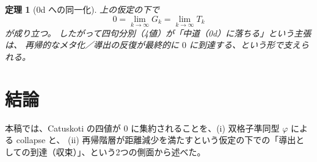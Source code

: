 \documentclass[12pt,a4paper]{article}
\newcommand{\dfix}{\mathfrak{0}}          %
\newcommand{\phiMap}{\varphi}            %
\newtheorem{theorem}{定理}[section]
\begin{document}
\begin{theorem}[0d への同一化]
上の仮定の下で
\[
\dfix
= \lim_{k \to \infty} G_k
= \lim_{k \to \infty} T_k
\]
が成り立つ。
したがって四句分別（4値）が「中道（0d）に落ちる」という主張は、
再帰的なメタ化／導出の反復が最終的に $\dfix$ に到達する、という形で支えられる。
\end{theorem}

\section{結論}

本稿では、Catuskoti の四値が $\dfix$ に集約されることを、(i) 双格子準同型 $\phiMap$ による collapse と、
(ii) 再帰階層が距離減少を満たすという仮定の下での「導出としての到達（収束）」、という2つの側面から述べた。
\end{document}
